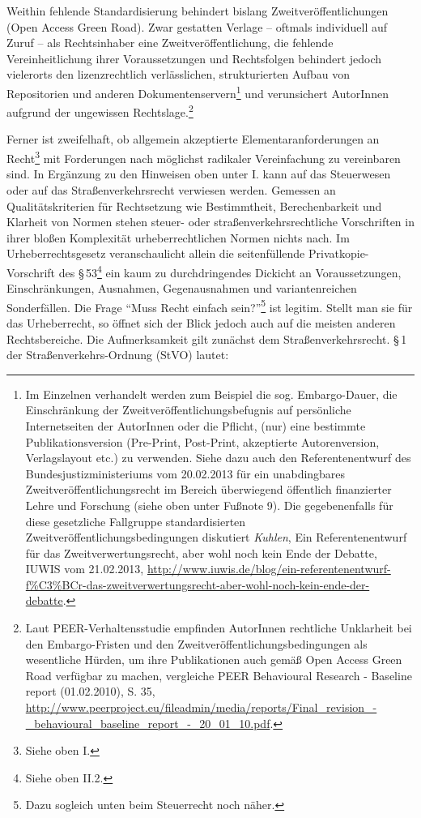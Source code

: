 \documentclass[output=paper]{langscibook}
\begin{document}
\noindent Weithin fehlende Standardisierung behindert bislang
Zweitveröffentlichungen (Open Access Green Road). Zwar gestatten Verlage
-- oftmals individuell auf Zuruf -- als Rechtsinhaber eine
Zweitveröffentlichung, die fehlende Vereinheitlichung ihrer
Voraussetzungen und Rechtsfolgen behindert jedoch vielerorts den
lizenzrechtlich verlässlichen, strukturierten Aufbau von Repositorien
und anderen Dokumentenservern\footnote{Im Einzelnen verhandelt werden
  zum Beispiel die sog. Embargo-Dauer, die Einschränkung der
  Zweitveröffentlichungsbefugnis auf persönliche Internetseiten der
  AutorInnen oder die Pflicht, (nur) eine bestimmte Publikationsversion
  (Pre-Print, Post-Print, akzeptierte Autorenversion, Verlagslayout
  etc.) zu verwenden. Siehe dazu auch den Referentenentwurf des
  Bundesjustizministeriums vom 20.02.2013 für ein unabdingbares
  Zweitveröffentlichungsrecht im Bereich überwiegend öffentlich
  finanzierter Lehre und Forschung (siehe oben unter Fußnote 9). Die gegebenenfalls für
  diese gesetzliche Fallgruppe standardisierten
  Zweitveröffentlichungsbedingungen diskutiert \emph{Kuhlen}, Ein
  Referentenentwurf für das Zweitverwertungsrecht, aber wohl noch kein
  Ende der Debatte, IUWIS vom 21.02.2013,
  \url{http://www.iuwis.de/blog/ein-referentenentwurf-f\%C3\%BCr-das-zweitverwertungsrecht-aber-wohl-noch-kein-ende-der-debatte}.}
und verunsichert AutorInnen aufgrund der ungewissen
Rechtslage.\footnote{Laut PEER-Verhaltensstudie empfinden AutorInnen
  rechtliche Unklarheit bei den Embargo-Fristen und den
  Zweitveröffentlichungsbedingungen als wesentliche Hürden, um ihre
  Publikationen auch gemäß Open Access Green Road verfügbar zu machen,
  vergleiche PEER Behavioural Research - Baseline report (01.02.2010), S. 35,
  \url{http://www.peerproject.eu/fileadmin/media/reports/Final_revision_-_behavioural_baseline_report_-_20_01_10.pdf}.}

Ferner ist zweifelhaft, ob allgemein akzeptierte Elementaranforderungen
an Recht\footnote{Siehe oben I.} mit Forderungen nach möglichst radikaler
Vereinfachung zu vereinbaren sind. In Ergänzung zu den Hinweisen oben
unter I. kann auf das Steuerwesen oder auf das Straßenverkehrsrecht
verwiesen werden. Gemessen an Qualitätskriterien für Rechtsetzung wie
Bestimmtheit, Berechenbarkeit und Klarheit von Normen stehen steuer-
oder straßenverkehrsrechtliche Vorschriften in ihrer bloßen Komplexität
urheberrechtlichen Normen nichts nach. Im Urheberrechtsgesetz
veranschaulicht allein die seitenfüllende Privatkopie-Vorschrift des §\,53\footnote{Siehe oben II.2.} ein kaum zu durchdringendes Dickicht an
Voraussetzungen, Einschränkungen, Ausnahmen, Gegenausnahmen und
variantenreichen Sonderfällen. Die Frage \enquote{Muss Recht einfach
sein?}\footnote{Dazu sogleich unten beim Steuerrecht noch näher.} ist
legitim. Stellt man sie für das Urheberrecht, so öffnet sich der Blick
jedoch auch auf die meisten anderen Rechtsbereiche. Die Aufmerksamkeit
gilt zunächst dem Straßenverkehrsrecht. §\,1 der Straßen\-verkehrs-Ordnung
(StVO) lautet:
\end{document}
